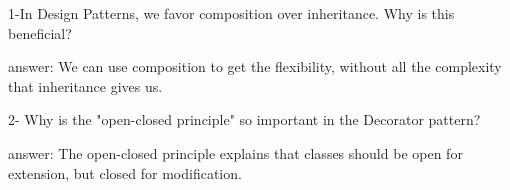 1-In Design Patterns, we favor composition over inheritance. Why is this beneficial?

answer: We can use composition to get the flexibility, without all the complexity that inheritance gives us.

2- Why is the "open-closed principle" so important in the Decorator pattern?

answer: The open-closed principle explains that classes should be open for extension, but closed for modification.
